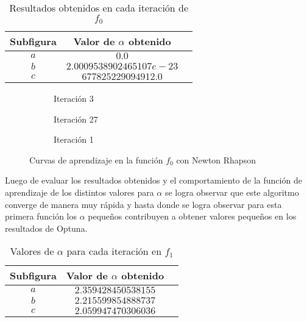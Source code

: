 \begin{table}[H]
    \centering
    \caption{Resultados obtenidos en cada iteración de $f_0$}
    \begin{tabular}{|c|c|c|}
    \hline
    \textbf{Subfigura} & \textbf{Valor de $\alpha$ obtenido} \\
    \hline
    $a$ & $ 0.0$ \\
    \hline
    $b$ & $2.0009538902465107e-23$ \\
    \hline
    $c$ & $677825229094912.0$ \\
    \hline
    \end{tabular}
    \label{tab:values_f0_newton}
\end{table}

\begin{figure}[H]
     \centering
     \begin{subfigure}[b]{0.45\textwidth}
         \centering
         
         \caption{Iteración 3}
         \label{fig:Newton-Rhapson-f0-3}
     \end{subfigure}
     \hfill
     \begin{subfigure}[b]{0.45\textwidth}
         \centering
         
         \caption{Iteración 27}
         \label{fig:Newton-Rhapson-f0-27}
     \end{subfigure}
     \hfill
     \begin{subfigure}[b]{0.45\textwidth}
         \centering
         
         \caption{Iteración 1}
         \label{fig:Newton-Rhapson-f0-1}
     \end{subfigure}
        \caption{Curvas de aprendizaje en la función $f_0$ con Newton Rhapson}
        \label{fig:learning-curves-f0}
\end{figure}

Luego de evaluar los resultados obtenidos y el comportamiento de la función de aprendizaje de los distintos valores para $\alpha$ se logra observar que este algoritmo converge de manera muy rápida y hasta donde se logra observar para esta primera función los $\alpha$ pequeños contribuyen a obtener valores pequeños en los resultados de Optuna.

\begin{table}[H]
    \centering
    \caption{ Valores de $\alpha$ para cada iteración en $f_1$}
    \begin{tabular}{|c|c|c|}
    \hline
    \textbf{Subfigura} & \textbf{Valor de $\alpha$ obtenido} \\
    \hline
    $a$ & $2.359428450538155$ \\
    \hline
    $b$ & $2.215599854888737$ \\
    \hline
    $c$ & $2.059947470306036$ \\
    \hline
    \end{tabular}
    \label{tab:values_f0_newton}
\end{table}

